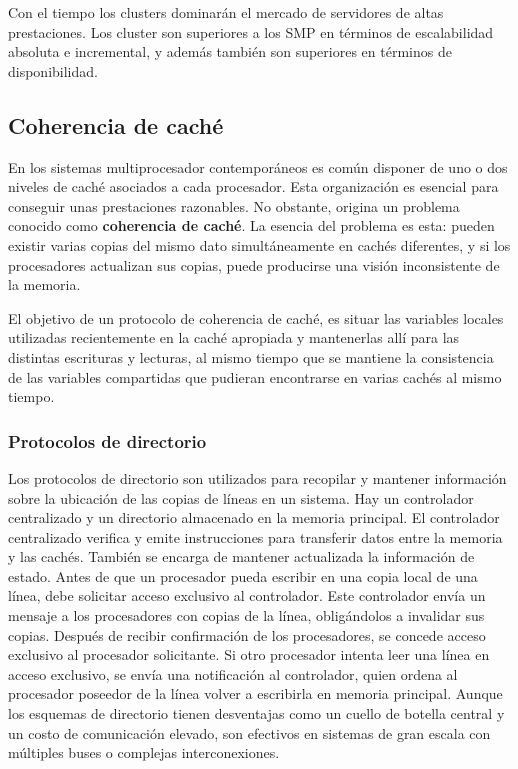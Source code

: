 Con el tiempo los clusters dominarán el mercado de servidores de altas prestaciones. Los cluster son superiores a los SMP en términos de escalabilidad absoluta e incremental, y además también son superiores en términos de disponibilidad.

\subsection{Coherencia de caché}

En los sistemas multiprocesador contemporáneos es común disponer de uno o dos niveles de caché asociados a cada procesador. Esta organización es esencial para conseguir unas prestaciones razonables. No obstante, origina un problema conocido como \textbf{coherencia de caché}. La esencia del problema es esta: pueden existir varias copias del mismo dato simultáneamente en cachés diferentes, y si los procesadores actualizan sus copias, puede producirse una visión inconsistente de la memoria.

El objetivo de un protocolo de coherencia de caché, es situar las variables locales utilizadas recientemente en la caché apropiada y mantenerlas allí para las distintas escrituras y lecturas, al mismo tiempo que se mantiene la consistencia de las variables compartidas que pudieran encontrarse en varias cachés al mismo tiempo.

\subsubsection{Protocolos de directorio}

 Los protocolos de directorio son utilizados para recopilar y mantener información sobre la ubicación de las copias de líneas en un sistema. Hay un controlador centralizado y un directorio almacenado en la memoria principal. El controlador centralizado verifica y emite instrucciones para transferir datos entre la memoria y las cachés. También se encarga de mantener actualizada la información de estado. Antes de que un procesador pueda escribir en una copia local de una línea, debe solicitar acceso exclusivo al controlador. Este controlador envía un mensaje a los procesadores con copias de la línea, obligándolos a invalidar sus copias. Después de recibir confirmación de los procesadores, se concede acceso exclusivo al procesador solicitante. Si otro procesador intenta leer una línea en acceso exclusivo, se envía una notificación al controlador, quien ordena al procesador poseedor de la línea volver a escribirla en memoria principal. Aunque los esquemas de directorio tienen desventajas como un cuello de botella central y un costo de comunicación elevado, son efectivos en sistemas de gran escala con múltiples buses o complejas interconexiones.

